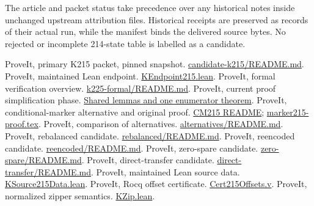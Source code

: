 \documentclass[11pt]{article}
\newcommand{\gh}[2]{\href{https://github.com/VladimirReshetnikov/ProveIt/blob/b6c7087477e51c017003bd729e712c8969733223/#1}{#2}}
\begin{document}
The article and packet status take precedence over any historical notes inside unchanged upstream attribution files. Historical receipts are preserved as records of their actual run, while the manifest binds the delivered source bytes. No rejected or incomplete 214-state table is labelled as a candidate.

\begin{thebibliography}{99}
\small
{} ProveIt, primary K215 packet, pinned snapshot. \gh{Computability/BusyBeaver/Research/ZFC/candidate-k215/README.md}{candidate-k215/README.md}.
 ProveIt, maintained Lean endpoint. \gh{Computability/BusyBeaver/Lean/BusyBeaver/ZFC/KEndpoint215.lean}{KEndpoint215.lean}.
 ProveIt, formal verification overview. \gh{Computability/BusyBeaver/Research/ZFC/k225-formal/README.md}{k225-formal/README.md}.
 ProveIt, current proof simplification phase. \gh{Computability/BusyBeaver/Research/ZFC/k225-formal/verification/k215/simplification/phase3/README.md}{Shared lemmas and one enumerator theorem}.
 ProveIt, conditional-marker alternative and original proof. \gh{Computability/BusyBeaver/Research/ZFC/candidate-k215/alternatives/conditional-marker/README.md}{CM215 README}; \gh{Computability/BusyBeaver/Research/ZFC/candidate-k215/alternatives/conditional-marker/proof/marker215-proof.tex}{marker215-proof.tex}.
 ProveIt, comparison of alternatives. \gh{Computability/BusyBeaver/Research/ZFC/candidate-k215/alternatives/README.md}{alternatives/README.md}.
 ProveIt, rebalanced candidate. \gh{Computability/BusyBeaver/Research/ZFC/candidate-k215/alternatives/rebalanced/README.md}{rebalanced/README.md}.
 ProveIt, reencoded candidate. \gh{Computability/BusyBeaver/Research/ZFC/candidate-k215/alternatives/reencoded/README.md}{reencoded/README.md}.
 ProveIt, zero-spare candidate. \gh{Computability/BusyBeaver/Research/ZFC/candidate-k215/alternatives/zero-spare/README.md}{zero-spare/README.md}.
 ProveIt, direct-transfer candidate. \gh{Computability/BusyBeaver/Research/ZFC/candidate-k215/alternatives/direct-transfer/README.md}{direct-transfer/README.md}.
 ProveIt, maintained Lean source data. \gh{Computability/BusyBeaver/Lean/BusyBeaver/ZFC/KSource215Data.lean}{KSource215Data.lean}.
 ProveIt, Rocq offset certificate. \gh{Computability/BusyBeaver/Research/ZFC/k225-formal/rocq/rocq-extension/coq/215/Cert215Offsets.v}{Cert215Offsets.v}.
 ProveIt, normalized zipper semantics. \gh{Computability/BusyBeaver/Lean/BusyBeaver/ZFC/KZip.lean}{KZip.lean}.

\end{thebibliography}
\end{document}
